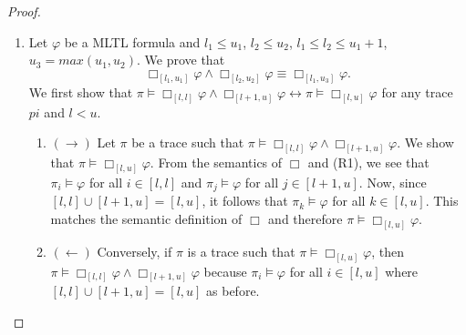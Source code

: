 \documentclass{article}
\begin{document}
\begin{proof}
\begin{enumerate}
    \item[(R4):] Let $\varphi$ be a MLTL formula and $l_1 \leq u_1$, $l_2 \leq u_2$, $l_1 \leq l_2 \leq u_1 + 1$, $u_3 = max(u_1, u_2)$. We prove that 
$$
    \Box_{[l_1,u_1]}{\varphi} \land \Box_{[l_2,u_2]}{\varphi} \equiv \Box_{[l_1,u_3]}{\varphi}.
$$
We first show that $ \pi \models \Box_{[l,l]}{\varphi} \land \Box_{[l+1,u]}{\varphi} \leftrightarrow \pi \models  \Box_{[l,u]}{\varphi}$ for any trace $pi$ and $l < u$. 
    \begin{enumerate}
    \item  $(\rightarrow)$
        Let $\pi$ be a trace such that $\pi \models \Box_{[l,l]}{\varphi} \land \Box_{[l+1,u]}{\varphi}$. 
        We show that $\pi \models \Box_{[l,u]}{\varphi}$. 
        From the semantics of $\Box_{}{}$ and (R1), we see that $\pi_i \models \varphi$ for all $i \in [l,l]$ and $\pi_j \models \varphi$ for all $j \in [l+1,u]$. 
        Now, since $[l,l] \cup [l+1,u] = [l,u]$, it follows that $\pi_k \models \varphi$ for all $k \in [l,u]$.
        This matches the semantic definition of $\Box_{}{}$ and therefore $\pi \models \Box_{[l,u]}{\varphi}$.
     
    \item  $(\leftarrow)$
        Conversely, if $\pi$ is a trace such that $\pi \models \Box_{[l,u]}{\varphi}$, then $\pi \models \Box_{[l,l]}{\varphi} \land \Box_{[l+1,u]}{\varphi}$ because $\pi_i \models \varphi$ for all $i \in [l,u]$ where $[l,l] \cup [l+1,u] = [l,u]$ as before.
    

\end{enumerate}
\end{enumerate}
\end{proof}
\end{document}

